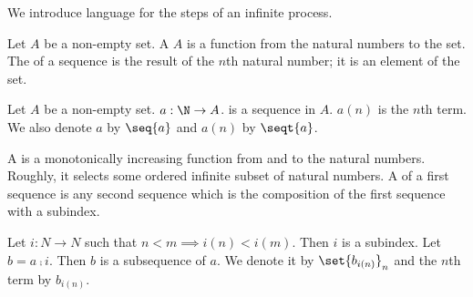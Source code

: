 
\sbasic








\sstart
{}


We introduce language
for the steps of an
infinite process.


Let $A$ be a non-empty
set.
A  $A$
is a function
from the natural numbers to the
set.
The  of a sequence
is the result of the $n$th natural
number; it is an element of the set.


Let $A$ be a non-empty set.
$a: \N \to A$.
is a sequence in $A$.
$a(n)$ is the $n$th term.
We also denote $a$ by
$\seq{a}$ and $a(n)$ by $\seqt{a}$.


A  is a monotonically
increasing function from and to the
natural numbers.
Roughly,
it
selects some ordered infinite
subset of natural numbers.
A  of a first
sequence is any second sequence
which is the composition of the
first sequence with a subindex.


Let $i: N \to N$ such that
$n < m \implies i(n) < i(m)$.
Then $i$ is a subindex.
Let $b = a \comp i$.
Then $b$ is a subsequence of $a$.
We denote it by
$\set{b_{i(n)}}_n$ and the $n$th
term by $b_{i(n)}$.
\strats
